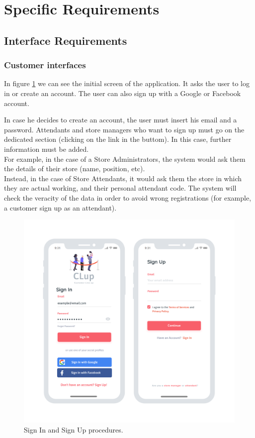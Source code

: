 \documentclass[table, 12pt]{article}
\begin{document}
\newpage
\section{Specific Requirements}
\subsection{Interface Requirements}
\subsubsection{Customer interfaces}
In figure \ref{mock_sign_in_up} we can see the initial screen of the application.
It asks the user to log in or create an account. The user can also sign up with a Google or Facebook account.

In case he decides to create an account, the user must insert his email and a password. Attendants and store managers who want to sign up must go on the dedicated section (clicking on the link in the buttom). In this case, further information must be added.\\

For example, in the case of a Store Administrators, the system would ask them the details of their store (name, position, etc).\\
Instead, in the case of Store Attendants, it would ask them the store in which they are actual working, and their personal attendant code. The system will check the veracity of the data in order to avoid wrong registrations (for example, a customer sign up as an attendant).
\begin{figure}[H]
    \begin{center}
        \includegraphics[width=\textwidth]{assets/Mockups/new_mock/sign_in__sign_up.png}
        \caption{Sign In and Sign Up procedures.}
        \label{mock_sign_in_up}
    \end{center}
\end{figure}
\end{document}

